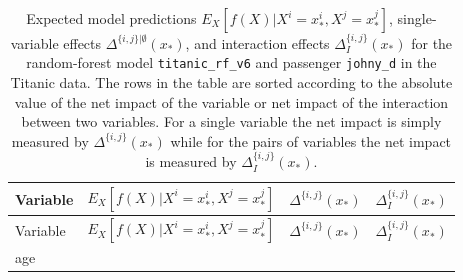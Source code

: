 \documentclass[12pt,]{krantz}
\begin{document}
\begin{longtable}[]{@{}lrrr@{}}
\caption{\label{tab:titanicIBreakDownList} Expected model predictions \(E_X[f(X)|X^i = x_*^i, X^j = x_*^j]\), single-variable effects \(\Delta^{\{i,j\}|\emptyset}(x_*)\), and interaction effects \(\Delta_{I}^{\{i,j\}}(x_*)\) for the random-forest model \texttt{titanic\_rf\_v6} and passenger \texttt{johny\_d} in the Titanic data. The rows in the table are sorted according to the absolute value of the net impact of the variable or net impact of the interaction between two variables. For a single variable the net impact is simply measured by \(\Delta^{\{i,j\}}(x_*)\) while for the pairs of variables the net impact is measured by \(\Delta_{I}^{\{i,j\}}(x_*)\).}\tabularnewline
\toprule
\begin{minipage}[b]{0.36\columnwidth}\raggedright
Variable\strut
\end{minipage} & \begin{minipage}[b]{0.14\columnwidth}\raggedleft
\(E_X[f(X)|X^{i}= x_*^{i},X^{j}= x_*^{j}]\)\strut
\end{minipage} & \begin{minipage}[b]{0.16\columnwidth}\raggedleft
\(\Delta^{\{i,j\}}(x_*)\)\strut
\end{minipage} & \begin{minipage}[b]{0.23\columnwidth}\raggedleft
\(\Delta_{I}^{\{i,j\}}(x_*)\)\strut
\end{minipage}\tabularnewline
\midrule
\endfirsthead
\toprule
\begin{minipage}[b]{0.36\columnwidth}\raggedright
Variable\strut
\end{minipage} & \begin{minipage}[b]{0.14\columnwidth}\raggedleft
\(E_X[f(X)|X^{i}= x_*^{i},X^{j}= x_*^{j}]\)\strut
\end{minipage} & \begin{minipage}[b]{0.16\columnwidth}\raggedleft
\(\Delta^{\{i,j\}}(x_*)\)\strut
\end{minipage} & \begin{minipage}[b]{0.23\columnwidth}\raggedleft
\(\Delta_{I}^{\{i,j\}}(x_*)\)\strut
\end{minipage}\tabularnewline
\midrule
\endhead
\begin{minipage}[t]{0.36\columnwidth}\raggedright
age\strut
\end{minipage} & \begin{minipage}[t]{0.14\columnwidth}\raggedleft
0.505\strut
\end{minipage} & \begin{minipage}[t]{0.16\columnwidth}\raggedleft

\end{minipage}
\end{longtable}
\end{document}
